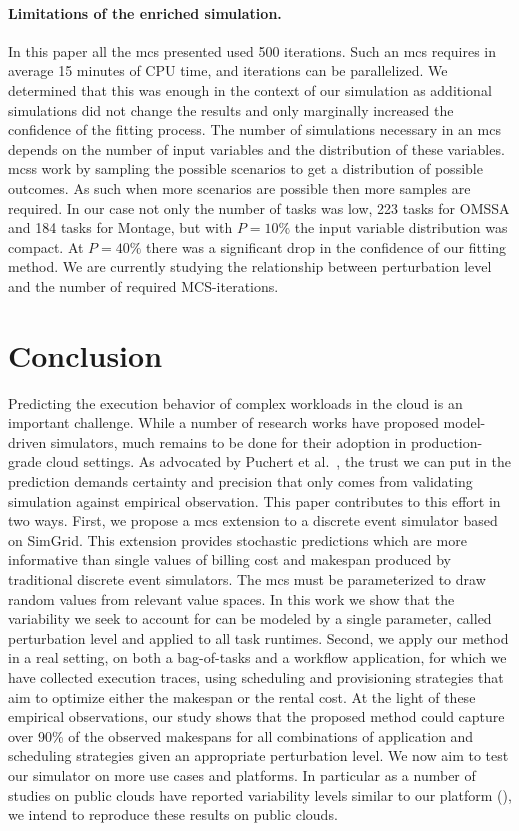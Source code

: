 \documentclass[]{llncs}
\begin{document}
\paragraph{Limitations of the enriched simulation.}\label{sec:lim}
%
In this paper all the \ac{mcs} presented used 500 iterations. Such an \ac{mcs}
requires in average 15 minutes of CPU time, and iterations can be parallelized.
We determined that this was enough in the context of our simulation as
additional simulations did not change the results and only marginally increased
the confidence of the fitting process. The number of simulations necessary in an
\ac{mcs} depends on the number of input variables and the distribution of these
variables.  \aclp{mcs} work by sampling the possible scenarios to get a
distribution of possible outcomes. As such when more scenarios are possible then
more samples are required. In our case not only the number of tasks was low, 223
tasks for OMSSA and 184 tasks for Montage, but with $P=10\%$ the input variable
distribution was compact. At $P=40\%$ there was a significant drop in the
confidence of our fitting method. We are currently studying the relationship
between perturbation level and the number of required MCS-iterations.

\section{Conclusion}
Predicting  the execution  behavior  of complex  workloads in  the  cloud is  an
important challenge. While a number of research works have proposed model-driven
simulators, much remains to be done for their adoption in production-grade cloud
settings. As  advocated by Puchert  et al.~\cite{PucherGWK15}, the trust  we can
put in  the prediction  demands certainty  and precision  that only  comes from
validating simulation against empirical observation.
%
This paper contributes to this effort in two ways. First, we propose a \acl{mcs}
extension  to a  discrete  event  simulator based  on  SimGrid.  This  extension
provides stochastic predictions which are more informative than single values of
billing cost  and makespan  produced by  traditional discrete  event simulators.
The \acl{mcs}  must be parameterized to  draw random values from  relevant value
spaces. In this work we show that the  variability we seek to account for can be
modeled  by a  single parameter,  called perturbation  level and applied  to all
task runtimes. Second, we apply our method in  a real setting, on both a
bag-of-tasks and a workflow  application, for which we have collected  execution
traces, using scheduling and provisioning strategies that  aim to optimize
either the makespan or the  rental cost.  At  the light of  these empirical
observations,  our study shows that the proposed method could capture over 90\%
of the observed makespans for  all  combinations  of  application   and
scheduling  strategies  given  an appropriate perturbation  level. We now aim
to test our simulator  on more use cases and platforms.  In particular as a
number of studies on public clouds have reported variability levels similar to
our platform (\cite{LeitnerC16,pics}), we intend to reproduce these results on
public clouds.



\end{document}
